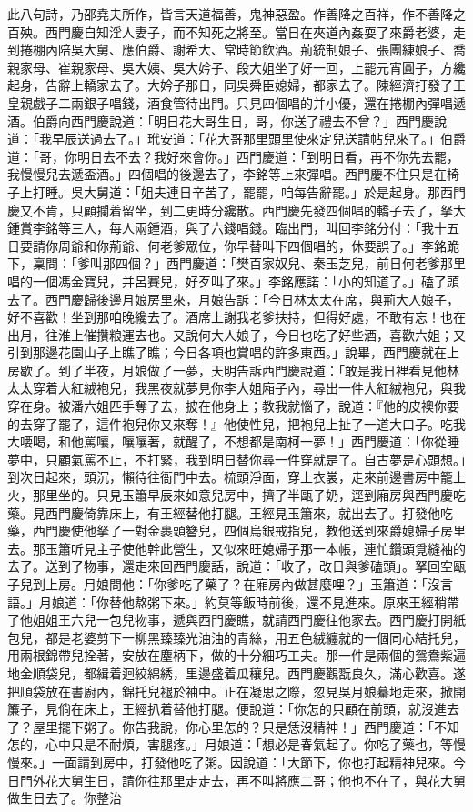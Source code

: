 \begin{showcontents}{}
此八句詩，乃邵堯夫所作，皆言天道福善，鬼神惡盈。作善降之百祥，作不善降之百殃。西門慶自知淫人妻子，而不知死之將至。當日在夾道內姦耍了來爵老婆，走到捲棚內陪吳大舅、應伯爵、謝希大、常時節飲酒。荊統制娘子、張團練娘子、喬親家母、崔親家母、吳大姨、吳大妗子、段大姐坐了好一回，上罷元宵圓子，方纔起身，告辭上轎家去了。大妗子那日，同吳舜臣媳婦，都家去了。陳經濟打發了王皇親戲子二兩銀子唱錢，酒食管待出門。只見四個唱的并小優，還在捲棚內彈唱遞酒。伯爵向西門慶說道：「明日花大哥生日，哥，你送了禮去不曾？」西門慶說道：「我早辰送過去了。」玳安道：「花大哥那里頭里使來定兒送請帖兒來了。」伯爵道：「哥，你明日去不去？我好來會你。」西門慶道：「到明日看，再不你先去罷，我慢慢兒去遞盃酒。」四個唱的後邊去了，李銘等上來彈唱。西門慶不住只是在椅子上打睡。吳大舅道：「姐夫連日辛苦了，罷罷，咱每告辭罷。」於是起身。那西門慶又不肯，只顧攔着留坐，到二更時分纔散。西門慶先發四個唱的轎子去了，拏大鍾賞李銘等三人，每人兩鍾酒，與了六錢唱錢。臨出門，叫回李銘分付：「我十五日要請你周爺和你荊爺、何老爹眾位，你早替叫下四個唱的，休要誤了。」李銘跪下，稟問：「爹叫那四個？」西門慶道：「樊百家奴兒、秦玉芝兒，前日何老爹那里唱的一個馮金寶兒，并呂賽兒，好歹叫了來。」李銘應諾：「小的知道了。」磕了頭去了。西門慶歸後邊月娘房里來，月娘告訴：「今日林太太在席，與荊大人娘子，好不喜歡！坐到那咱晚纔去了。酒席上謝我老爹扶持，但得好處，不敢有忘！也在出月，往淮上催攢粮運去也。又說何大人娘子，今日也吃了好些酒，喜歡六姐；又引到那邊花園山子上瞧了瞧；今日各項也賞唱的許多東西。」說畢，西門慶就在上房歇了。到了半夜，月娘做了一夢，天明告訴西門慶說道：「敢是我日裡看見他林太太穿着大紅絨袍兒，我黑夜就夢見你李大姐廂子內，尋出一件大紅絨袍兒，與我穿在身。被潘六姐匹手奪了去，披在他身上；教我就惱了，說道：『他的皮襖你要的去穿了罷了，這件袍兒你又來奪！』他使性兒，把袍兒上扯了一道大口子。吃我大喓喝，和他罵嚷，嚷嚷著，就醒了，不想都是南柯一夢！」西門慶道：「你從睡夢中，只顧氣罵不止，不打緊，我到明日替你尋一件穿就是了。自古夢是心頭想。」到次日起來，頭沉，懶待往衙門中去。梳頭淨面，穿上衣裳，走來前邊書房中籠上火，那里坐的。只見玉簫早辰來如意兒房中，擠了半甌子奶，逕到廂房與西門慶吃藥。見西門慶倚靠床上，有王經替他打腿。王經見玉簫來，就出去了。打發他吃藥，西門慶使他拏了一對金裹頭簪兒，四個烏銀戒指兒，教他送到來爵媳婦子房里去。那玉簫听見主子使他幹此營生，又似來旺媳婦子那一本帳，連忙鑽頭覓縫袖的去了。送到了物事，還走來回西門慶話，說道：「收了，改日與爹磕頭」。拏回空甌子兒到上房。月娘問他：「你爹吃了藥了？在廂房內做甚麼哩？」玉簫道：「沒言語。」月娘道：「你替他熬粥下來。」約莫等飯時前後，還不見進來。原來王經稍帶了他姐姐王六兒一包兒物事，遞與西門慶瞧，就請西門慶往他家去。西門慶打開紙包兒，都是老婆剪下一柳黑臻臻光油油的青絲，用五色絨纏就的一個同心結托兒，用兩根錦帶兒拴著，安放在塵柄下，做的十分細巧工夫。那一件是兩個的鴛鴦紫遍地金順袋兒，都緝着迴絞綿綉，里邊盛着瓜穰兒。西門慶觀翫良久，滿心歡喜。遂把順袋放在書廚內，錦托兒褪於袖中。正在凝思之際，忽見吳月娘驀地走來，掀開簾子，見倘在床上，王經扒着替他打腿。便說道：「你怎的只顧在前頭，就沒進去了？屋里擺下粥了。你告我說，你心里怎的？只是恁沒精神！」西門慶道：「不知怎的，心中只是不耐煩，害腿疼。」月娘道：「想必是春氣起了。你吃了藥也，等慢慢來。」一面請到房中，打發他吃了粥。因說道：「大節下，你也打起精神兒來。今日門外花大舅生日，請你往那里走走去，再不叫將應二哥；他也不在了，與花大舅做生日去了。你整治
\end{showcontents}
